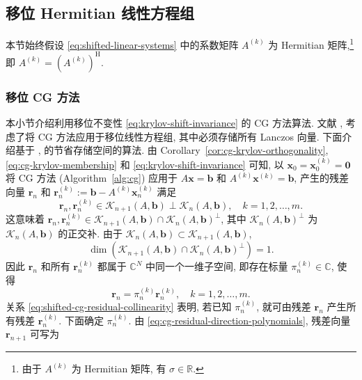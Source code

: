 \subsection{{移位 Hermitian 线性方程组}}\label{sec:shifted-hermitian-systems}
{本节始终假设 \eqref{eq:shifted-linear-systems} 中的系数矩阵 $A^{(k)}$ 为 Hermitian 矩阵,}\footnote{{由于 $A^{(k)}$ 为 Hermitian 矩阵, 有 $\sigma\in\mathbb R$.}}{即 $A^{(k)}=(A^{(k)})^{\mathrm H}$.}
\subsubsection{{移位 CG 方法}}\label{subsec:shifted-cg}
{本小节介绍利用移位不变性 \eqref{eq:krylov-shift-invariance} 的 CG 方法算法. 文献 ,  考虑了将 CG 方法应用于移位线性方程组, 其中必须存储所有 Lanczos 向量. 下面介绍基于 ,  的节省存储空间的算法.}
{由 Corollary\ \ref{cor:cg-krylov-orthogonality}, \eqref{eq:cg-krylov-membership} 和 \eqref{eq:krylov-shift-invariance} 可知, 以 $\bm x_0=\bm x_0^{(k)}=\bm0$ 将 CG 方法 (Algorithm\ \ref{alg:cg}) 应用于 $A\bm x=\bm b$ 和 $A^{(k)}\bm x^{(k)}=\bm b$, 产生的残差向量 $\bm r_n$ 和 $\bm r_n^{(k)}:=\bm b-A^{(k)}\bm x_n^{(k)}$ 满足}
\[\bm r_n,\bm r_n^{(k)}\in\mathcal K_{n+1}(A,\bm b)\perp\mathcal K_n(A,\bm b),\quad k=1,2,\ldots,m.\]
{这意味着 $\bm r_n,\bm r_n^{(k)}\in\mathcal K_{n+1}(A,\bm b)\cap\mathcal K_n(A,\bm b)^{\perp}$, 其中 $\mathcal K_n(A,\bm b)^{\perp}$ 为 $\mathcal K_n(A,\bm b)$ 的正交补. 由于 $\mathcal K_n(A,\bm b)\subset\mathcal K_{n+1}(A,\bm b)$,}
\begin{equation}\label{eq:shifted-cg-one-dimensional-intersection}\dim(\mathcal K_{n+1}(A,\bm b)\cap\mathcal K_n(A,\bm b)^{\perp})=1.\end{equation}
{因此 $\bm r_n$ 和所有 $\bm r_n^{(k)}$ 都属于 $\mathbb C^N$ 中同一个一维子空间, 即存在标量 $\pi_n^{(k)}\in\mathbb C$, 使得}
\begin{equation}\label{eq:shifted-cg-residual-collinearity}\bm r_n=\pi_n^{(k)}\bm r_n^{(k)},\quad k=1,2,\ldots,m.\end{equation}
{关系 \eqref{eq:shifted-cg-residual-collinearity} 表明, 若已知 $\pi_n^{(k)}$, 就可由残差 $\bm r_n$ 产生所有残差 $\bm r_n^{(k)}$. 下面确定 $\pi_n^{(k)}$.}
{由 \eqref{eq:cg-residual-direction-polynomials}, 残差向量 $\bm r_{n+1}$ 可写为}
